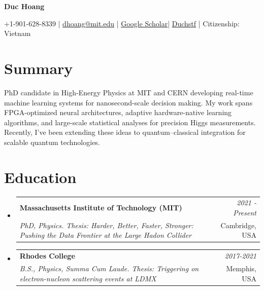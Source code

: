\documentclass[a4paper,11pt]{article}
\makeatletter
\newcommand{\resumeSubheading}[4]{
\vspace{0.5mm}\item
    \begin{tabular*}{0.98\textwidth}[t]{l@{\extracolsep{\fill}}r}
        \textbf{#1} & \textit{\footnotesize{#4}} \\
        \textit{\footnotesize{#3}} &  \footnotesize{#2}\\
    \end{tabular*}
    \vspace{-2.4mm}
}
\newcommand{\resumeSubHeadingListStart}{\begin{itemize}[leftmargin=*,labelsep=1mm]}
\newcommand{\resumeSubHeadingListEnd}{\end{itemize}\vspace{2mm}}
\newcommand{\socialicon}[1]{\raisebox{-0.05em}{\resizebox{!}{1em}{#1}}}
\newcommand{\headerfontiii}{\fontfamily{ppl}\selectfont} %
\makeatother
\begin{document}
\headerfontiii

\begin{center}
    {\Large\textbf{Duc Hoang}}
\end{center}
\vspace{-6mm}

\begin{center}
    \small{
    +1-901-628-8339 | \href{mailto:dhoang@mit.edu}{dhoang@mit.edu} | 
    \href{https://scholar.google.com/citations?user=3MtLWK8AAAAJ&hl=fr}{Google Scholar}|
    \socialicon{\faGithub} \href{https://github.com/Duchstf}{Duchstf} 
    | Citizenship: Vietnam
    }
\end{center}
\vspace{-6mm}

\section{\textbf{Summary}}
\vspace{1mm}
\small{
PhD candidate in High-Energy Physics at MIT and CERN developing real-time machine learning systems for nanosecond-scale decision making. My work spans FPGA-optimized neural architectures, adaptive hardware-native learning algorithms, and large-scale statistical analyses for precision Higgs measurements. Recently, I’ve been extending these ideas to quantum–classical integration for scalable quantum technologies.
}
\vspace{-2mm}

\section{\textbf{Education}}
\vspace{-0.4mm}
\resumeSubHeadingListStart

\resumeSubheading
{Massachusetts Institute of Technology (MIT)}{Cambridge, USA}
{PhD, Physics. Thesis: Harder, Better, Faster, Stronger: Pushing the Data Frontier at the Large Hadon Collider}{2021 - Present}

\resumeSubheading
{Rhodes College}{Memphis, USA}
{B.S., Physics, Summa Cum Laude. Thesis: Triggering on electron-nucleon scattering events at LDMX}{2017-2021}

\resumeSubHeadingListEnd
\vspace{-6mm}
\end{document}

